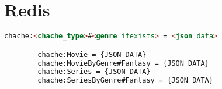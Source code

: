 \section{Redis}

\begin{tcolorbox}
    \lstset{style=htmlstyle}
    \begin{lstlisting}[language={html}, caption={Logs HBASE Model}, label={lst:log}]
        chache:<chache_type>#<genre ifexists> = <json data>

        chache:Movie = {JSON DATA}
        chache:MovieByGenre#Fantasy = {JSON DATA}
        chache:Series = {JSON DATA}
        chache:SeriesByGenre#Fantasy = {JSON DATA}
    \end{lstlisting}
\end{tcolorbox}